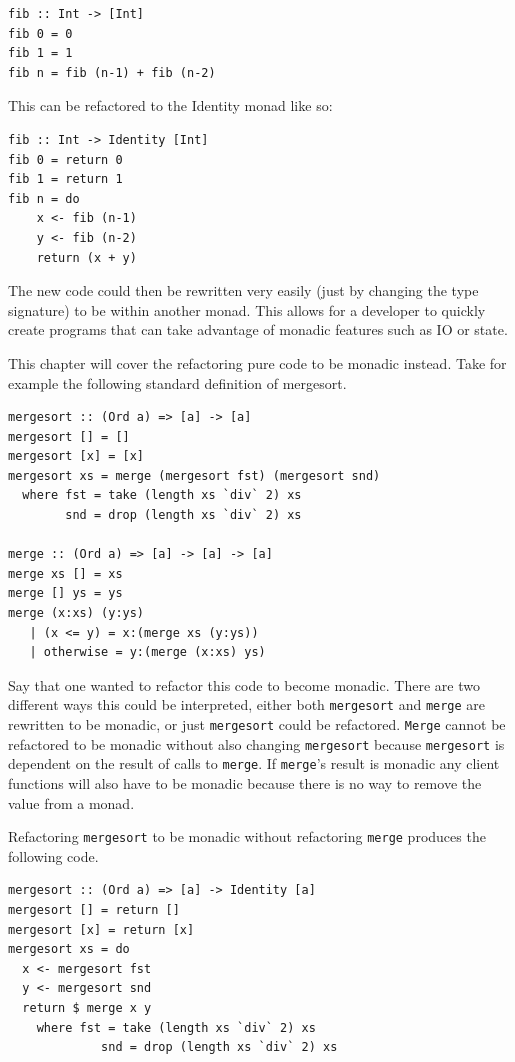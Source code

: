 \begin{lstlisting}[frame=tblr]
fib :: Int -> [Int]
fib 0 = 0
fib 1 = 1
fib n = fib (n-1) + fib (n-2)
\end{lstlisting} 

This can be refactored to the Identity monad like so:

\begin{lstlisting}[frame=tblr]
fib :: Int -> Identity [Int]
fib 0 = return 0
fib 1 = return 1
fib n = do
	x <- fib (n-1)
	y <- fib (n-2)
	return (x + y)
\end{lstlisting}

The new code could then be rewritten very easily (just by changing the type signature) to be within another monad. This allows for a developer to quickly create programs that can take advantage of monadic features such as IO or state.



This chapter will cover the refactoring pure code to be monadic instead. Take for example the following standard definition of mergesort.

\begin{lstlisting}[frame=tblr]
mergesort :: (Ord a) => [a] -> [a]
mergesort [] = []
mergesort [x] = [x]
mergesort xs = merge (mergesort fst) (mergesort snd)
  where fst = take (length xs `div` 2) xs
        snd = drop (length xs `div` 2) xs

merge :: (Ord a) => [a] -> [a] -> [a]
merge xs [] = xs
merge [] ys = ys
merge (x:xs) (y:ys)
   | (x <= y) = x:(merge xs (y:ys))
   | otherwise = y:(merge (x:xs) ys)
\end{lstlisting}

Say that one wanted to refactor this code to become monadic. There are two different ways this could be interpreted, either both \texttt{mergesort} and \texttt{merge} are rewritten to be monadic, or just \texttt{mergesort} could be refactored. \texttt{Merge} cannot be refactored to be monadic without also changing \texttt{mergesort} because \texttt{mergesort} is dependent on the result of calls to \texttt{merge}. If \texttt{merge}'s result is monadic any client functions will also have to be monadic because there is no way to remove the value from a monad. 

Refactoring \texttt{mergesort} to be monadic without refactoring \texttt{merge} produces the following code.

\begin{lstlisting}[frame=tblr]
mergesort :: (Ord a) => [a] -> Identity [a]
mergesort [] = return []
mergesort [x] = return [x]
mergesort xs = do
  x <- mergesort fst
  y <- mergesort snd
  return $ merge x y
    where fst = take (length xs `div` 2) xs
             snd = drop (length xs `div` 2) xs
\end{lstlisting}  

